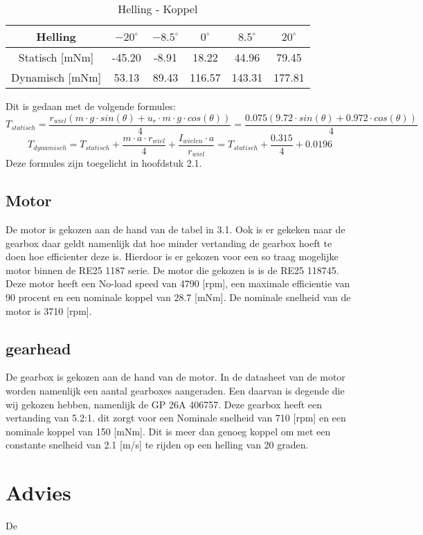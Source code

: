 \documentclass{article}
\begin{document}
        \begin{table}[h]
            \centering
            \begin{tabular}{|c|c|c|c|c|c|}
            \hline
            Helling & $-20 ^\circ$ & $-8.5 ^\circ$ & $0 ^\circ$ & $8.5 ^\circ$ & $20 ^\circ$ \\ \hline
            Statisch [mNm]  & -45.20   & -8.91   & 18.22   & 44.96  & 79.45   \\ \hline
            Dynamisch [mNm]  & 53.13  & 89.43   & 116.57  & 143.31  & 177.81  \\ \hline
            \end{tabular}
            \caption{Helling - Koppel}
            \label{tab}
        \end{table}
        Dit is gedaan met de volgende formules:
        $$T_{statisch} = \frac{r_{wiel}(m \cdot g \cdot sin(\theta) + u_r \cdot m \cdot g \cdot cos(\theta))}{4} = \frac{0.075(9.72 \cdot sin(\theta) +  0.972 \cdot cos(\theta))}{4}$$
        $$T_{dynamisch} = T_{statisch} + \frac{m \cdot a \cdot r_{wiel}}{4} + \frac{I_{wielen} \cdot a}{r_{wiel}} = T_{statisch} + \frac{0.315}{4}+ 0.0196 $$
        Deze formules zijn toegelicht in hoofdstuk 2.1.
        
    \subsection{Motor}
    De motor is gekozen aan de hand van de tabel in 3.1. 
    Ook is er gekeken naar de gearbox daar geldt namenlijk dat hoe minder vertanding de gearbox hoeft te doen hoe efficienter deze is. 
    Hierdoor is er gekozen voor een so traag mogelijke motor binnen de RE25 1187 serie.
    De motor die gekozen is is de RE25 118745. 
    Deze motor heeft een No-load speed van 4790 [rpm], een maximale efficientie van 90 procent en een nominale koppel van 28.7 [mNm].
    De nominale snelheid van de motor is 3710 [rpm].
    

    \subsection{gearhead}
    De gearbox is gekozen aan de hand van de motor. 
    In de datasheet van de motor worden namenlijk een aantal gearboxes aangeraden.
    Een daarvan is degende die wij gekozen hebben, namenlijk de GP 26A 406757. 
    Deze gearbox heeft een vertanding van 5.2:1. dit zorgt voor een Nominale snelheid van 710 [rpm] en een nominale koppel van 150 [mNm]. 
    Dit is meer dan genoeg koppel om met een constante snelheid van 2.1 [m/s] te rijden op een helling van 20 graden.

\section{Advies}
    De


\clearpage
\appendix


\end{document}
